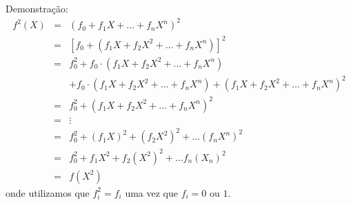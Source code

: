 \documentclass[portuguese,aspectratio=169]{beamer}
\begin{document}
\begin{frame}[allowframebreaks]
   Demonstração:
   \begin{eqnarray}
     f^2(X) &=& (f_0 + f_1 X + \ldots + f_n X^n)^2 \nonumber\\
            &=& [f_0 + (f_1 X + f_2 X^2 + \ldots + f_n X^n)]^2 \nonumber\\
            &=& f^2_0 + f_0 \cdot (f_1 X + f_2 X^2 + \ldots + f_n X^n) \nonumber\\
             && + f_0 \cdot (f_1 X + f_2 X^2 + \ldots + f_n X^n) + (f_1 X + f_2 X^2 + \ldots + f_n X^n)^2 \nonumber\\
            &=& f^2_0 + (f_1 X + f_2 X^2 + \ldots + f_n X^n)^2 \nonumber\\
            &=& \vdots \nonumber\\
            &=& f^2_0 + (f_1 X)^2 + (f_2 X^2)^2 + \ldots (f_n X^n)^2 \nonumber\\
            &=& f^2_0 + f_1 X^2 + f_2 (X^2)^2 + \ldots f_n (X_n)^2 \nonumber \\
            &=& f(X^2)
   \end{eqnarray}
   onde utilizamos que $f^2_i = f_i$ uma vez que $f_i = 0\text{ ou }1$.

\end{frame}
\end{document}
